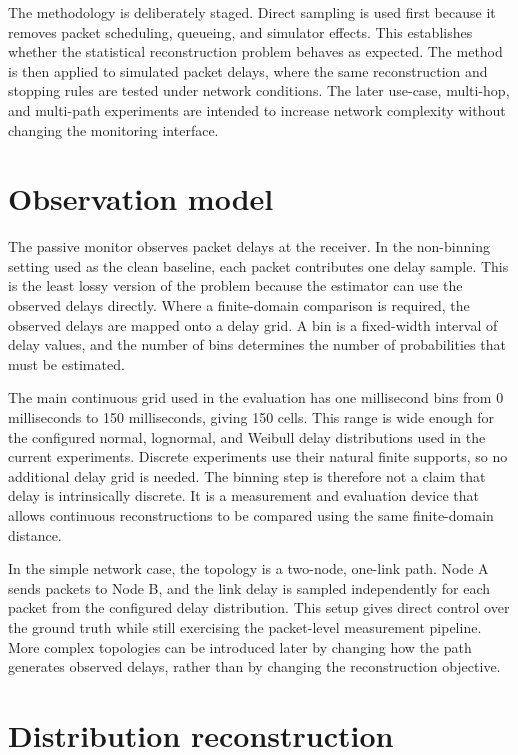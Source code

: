 \documentclass[a4paper,11pt]{report}
\begin{document}
The methodology is deliberately staged. Direct sampling is used first because it removes packet scheduling, queueing, and simulator effects. This establishes whether the statistical reconstruction problem behaves as expected. The method is then applied to simulated packet delays, where the same reconstruction and stopping rules are tested under network conditions. The later use-case, multi-hop, and multi-path experiments are intended to increase network complexity without changing the monitoring interface.

\section{Observation model}
\label{sec:method-observation-model}

The passive monitor observes packet delays at the receiver. In the non-binning setting used as the clean baseline, each packet contributes one delay sample. This is the least lossy version of the problem because the estimator can use the observed delays directly. Where a finite-domain comparison is required, the observed delays are mapped onto a delay grid. A bin is a fixed-width interval of delay values, and the number of bins determines the number of probabilities that must be estimated.

The main continuous grid used in the evaluation has one millisecond bins from 0 milliseconds to 150 milliseconds, giving 150 cells. This range is wide enough for the configured normal, lognormal, and Weibull delay distributions used in the current experiments. Discrete experiments use their natural finite supports, so no additional delay grid is needed. The binning step is therefore not a claim that delay is intrinsically discrete. It is a measurement and evaluation device that allows continuous reconstructions to be compared using the same finite-domain distance.

In the simple network case, the topology is a two-node, one-link path. Node A sends packets to Node B, and the link delay is sampled independently for each packet from the configured delay distribution. This setup gives direct control over the ground truth while still exercising the packet-level measurement pipeline. More complex topologies can be introduced later by changing how the path generates observed delays, rather than by changing the reconstruction objective.

\section{Distribution reconstruction}
\label{sec:method-distribution-reconstruction}
\end{document}
